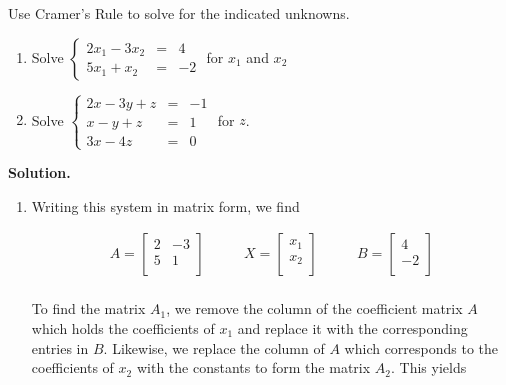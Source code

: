 \documentclass{ximera}
\begin{document}
\begin{example}  Use Cramer's Rule to solve for the indicated unknowns.

\begin{enumerate}

\item  Solve $\left\{ \begin{array}{rcr} 2x_{1} - 3x_2 & = & 4 \\ 5x_{1} + x_2 & = & -2   \end{array} \right.$ for $x_{1}$ and $x_2$

\item  Solve $\left\{ \begin{array}{rcr} 2x - 3y + z & = & -1 \\ x-y+z & = & 1 \\ 3x-4z & = & 0   \end{array} \right.$ for $z$.

\end{enumerate}

{\bf Solution.}  

\begin{enumerate}

\item  Writing this system in matrix form, we find 

\[ \begin{array}{ccc}

A = \left[ \begin{array}{rr} 2 & -3 \\ 5 & 1 \\ \end{array} \right] 
&
\qquad X = \left[ \begin{array}{r} x_{1} \\ x_2 \\ \end{array} \right] 
& 
\qquad B = \left[ \begin{array}{r} 4 \\ -2 \\ \end{array} \right] \\

\end{array} \]

To find the matrix $A_{1}$, we remove the column of the coefficient matrix $A$ which holds the coefficients of $x_{1}$ and replace it with the corresponding entries in $B$.  Likewise, we replace the column of $A$ which corresponds to the coefficients of $x_2$ with the constants to form the matrix $A_2$.  This yields 


\end{enumerate}
\end{example}
\end{document}
